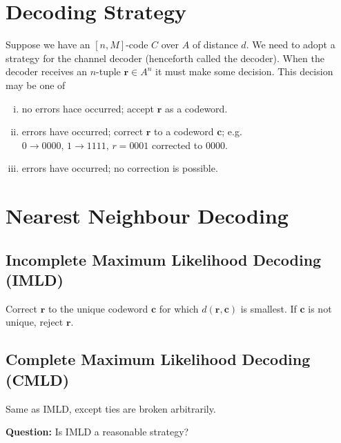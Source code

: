 
\section{Decoding Strategy}
Suppose we have an $ [n,M] $-code $ C $ over $ A $ of distance $ d $.
We need to adopt a strategy for the channel decoder (henceforth called the decoder).
When the decoder receives an $ n $-tuple $ \bm{r}\in A^n $ it must make some decision.
This decision may be one of
\begin{enumerate}[(i)]
    \item no errors hace occurred; accept $ \bm{r} $ as a codeword.
    \item errors have occurred; correct $ \bm{r} $ to a codeword $ \bm{c} $;
          e.g. $ 0 \rightarrow 0000,\,1 \rightarrow 1111,\,r=0001 $ corrected to
          $ 0000 $.
    \item errors have occurred; no correction is possible.
\end{enumerate}

\section{Nearest Neighbour Decoding}
\subsection{Incomplete Maximum Likelihood Decoding (IMLD)}
Correct $ \bm{r} $ to the unique codeword $ \bm{c} $ for which
$ d(\bm{r},\bm{c}) $ is smallest.
If $ \bm{c} $ is not unique, reject $ \bm{r} $.
\subsection{Complete Maximum Likelihood Decoding (CMLD)}
Same as IMLD, except ties are broken arbitrarily.

\textbf{Question:} Is IMLD a reasonable strategy?

